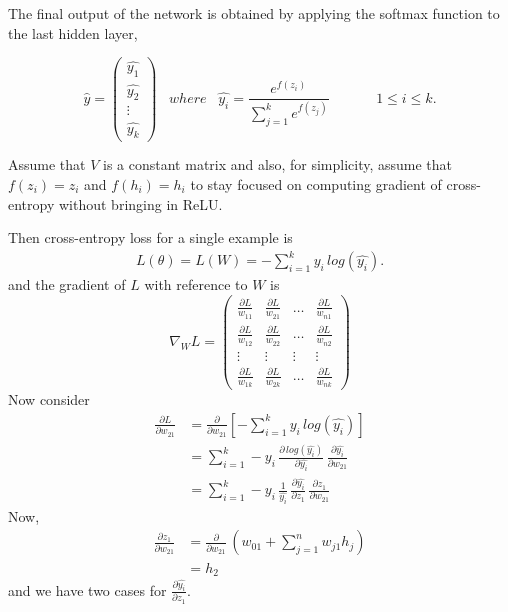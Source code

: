 \documentclass[fleqn, 12pt]{article}
\begin{document}
The final output of the network is obtained by applying the softmax function to the last hidden layer,

\[
\hat{y} = 
\left(
\begin{array}{c}
\hat{y_1} \\
\hat{y_2} \\
\vdots \\
\hat{y_k}
\end{array}
\right)
\hspace{10pt} where \hspace{10pt}
\hat{y_i} = \frac{e^{f(z_i)}}{\sum_{j=1}^k{e^{f(z_j)}}}
\hspace{40pt} 1 \leq i \leq k.
\]

Assume that $V$ is a constant matrix and also, for simplicity, assume that $f(z_i) = z_i$ and $f(h_i) = h_i$ to stay focused on computing gradient of cross-entropy without bringing in ReLU.

Then cross-entropy loss for a single example is
\begin{align}
    L(\theta) = L(W) = - \sum_{i=1}^k {y_i \, log(\hat{y_i})}.
\end{align}
and the gradient of $L$ with reference to $W$ is
\[ \nabla_W L = \left(
\begin{array}{cccc}
\frac{\partial L}{w_{11}} & \frac{\partial L}{w_{21}} & \ldots & \frac{\partial L}{w_{n1}} \\[10pt]
\frac{\partial L}{w_{12}} & \frac{\partial L}{w_{22}} & \ldots & \frac{\partial L}{w_{n2}} \\[10pt]
\vdots & \vdots & \vdots & \vdots \\[10pt]
\frac{\partial L}{w_{1k}} & \frac{\partial L}{w_{2k}} & \ldots & \frac{\partial L}{w_{nk}}
\end{array}
\right) \]
Now consider
\begin{align}
    \frac{\partial L}{\partial w_{21}} & = \frac{\partial}{\partial w_{21}} \left[- \sum_{i=1}^k y_i \, log(\hat{y_i}) \right] \\
    & = \sum_{i=1}^k - y_i \, \frac{\partial \, log(\hat{y_i})}{\partial \hat{y_i}} \, \frac{\partial \hat{y_i}}{\partial w_{21}} \\
    & = \sum_{i=1}^k - y_i \, \frac{1}{\hat{y_i}} \, \frac{\partial \hat{y_i}}{\partial z_1} \, \frac{\partial z_1}{\partial w_{21}}
\end{align}
Now,
\begin{align}
    \frac{\partial z_1}{\partial w_{21}} & = \frac{\partial} {\partial w_{21}} \, \left( w_{01} + \sum_{j=1}^n w_{j1} h_j \right) \\[10pt]
    & = h_2
\end{align}
and we have two cases for $\frac{\partial \hat{y_i}}{\partial z_1}$.
\end{document}
